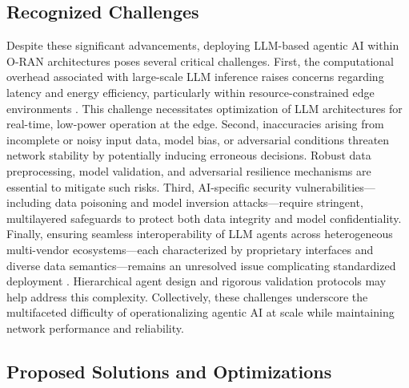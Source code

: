 \documentclass[sigconf]{acmart}
\begin{document}
\subsection{Recognized Challenges}

Despite these significant advancements, deploying LLM-based agentic AI within O-RAN architectures poses several critical challenges. First, the computational overhead associated with large-scale LLM inference raises concerns regarding latency and energy efficiency, particularly within resource-constrained edge environments \cite{ref55,ref48}. This challenge necessitates optimization of LLM architectures for real-time, low-power operation at the edge. Second, inaccuracies arising from incomplete or noisy input data, model bias, or adversarial conditions threaten network stability by potentially inducing erroneous decisions. Robust data preprocessing, model validation, and adversarial resilience mechanisms are essential to mitigate such risks. Third, AI-specific security vulnerabilities—including data poisoning and model inversion attacks—require stringent, multilayered safeguards to protect both data integrity and model confidentiality. Finally, ensuring seamless interoperability of LLM agents across heterogeneous multi-vendor ecosystems—each characterized by proprietary interfaces and diverse data semantics—remains an unresolved issue complicating standardized deployment \cite{ref55,ref48}. Hierarchical agent design and rigorous validation protocols may help address this complexity. Collectively, these challenges underscore the multifaceted difficulty of operationalizing agentic AI at scale while maintaining network performance and reliability.

\subsection{Proposed Solutions and Optimizations}
\end{document}
